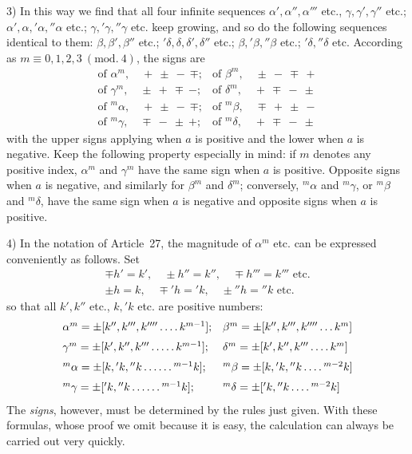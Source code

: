 3) In this way we find that all four infinite sequences $\alpha',\alpha'',\alpha'''$ etc., $\gamma,\gamma',\gamma''$ etc.; $\alpha',\alpha,{}'\alpha,{}''\alpha$ etc.; $\gamma,{}'\gamma,{}''\gamma$ etc. keep growing, and so do the following sequences identical to them: $\beta,\beta',\beta''$ etc.; ${}'\delta,\delta,\delta',\delta''$ etc.; $\beta,{}'\beta,{}''\beta$ etc.; ${}'\delta,{}''\delta$ etc. According as $m\equiv0,1,2,3\ (\mathrm{mod.}\ 4)$, the signs are
\[
\begin{array}{ll}
\text{of }\alpha^m,\quad +\ \pm\ -\ \mp;&\text{of }\beta^m,\quad \pm\ -\ \mp\ +\\[6pt]
\text{of }\gamma^m,\quad \pm\ +\ \mp\ -;&\text{of }\delta^m,\quad +\ \mp\ -\ \pm\\[6pt]
\text{of }{}^m\alpha,\quad +\ \pm\ -\ \mp;&\text{of }{}^m\beta,\quad \mp\ +\ \pm\ -\\[6pt]
\text{of }{}^m\gamma,\quad \mp\ -\ \pm\ +;&\text{of }{}^m\delta,\quad +\ \mp\ -\ \pm
\end{array}
\]
with the upper signs applying when $a$ is positive and the lower when $a$ is negative. Keep the following property especially in mind: if $m$ denotes any positive index, $\alpha^m$ and $\gamma^m$ have the same sign when $a$ is positive. Opposite signs when $a$ is negative, and similarly for $\beta^m$ and $\delta^m$; conversely, ${}^m\alpha$ and ${}^m\gamma$, or ${}^m\beta$ and ${}^m\delta$, have the same sign when $a$ is negative and opposite signs when $a$ is positive.

4) In the notation of Article~27, the magnitude of $\alpha^m$ etc. can be expressed conveniently as follows. Set
\[
\begin{gathered}
\mp h'=k',\quad \pm h''=k'',\quad \mp h'''=k'''\text{ etc.}\\
\pm h=k,\quad \mp{}'h={}'k,\quad \pm{}''h={}''k\text{ etc.}
\end{gathered}
\]
so that all $k',k''$ etc., $k,{}'k$ etc. are positive numbers:
{\small
\setlength{\arraycolsep}{3pt}
\[
\begin{array}{ll}
\alpha^m=\pm[k'',k''',k''''\mathinner{\ldotp\ldotp\ldotp\ldotp} k^{m-1}];&\beta^m=\pm[k'',k''',k''''\mathinner{\ldotp\ldotp\ldotp} {k^m]}\\[6pt]
\gamma^m=\pm[k',k'',k'''\mathinner{\ldotp\ldotp\ldotp\ldotp\ldotp} k^{m-1}];&\delta^m=\pm[k',k'',k'''\mathinner{\ldotp\ldotp\ldotp\ldotp} k^m]\\[6pt]
{}^m\alpha=\pm[k,{}'k,{}''k\mathinner{\ldotp\ldotp\ldotp\ldotp\ldotp\ldotp}{}^{m-1}k];&{}^m\beta=\pm[k,{}'k,{}''k\mathinner{\ldotp\ldotp\ldotp\ldotp}{}^{m-2}k]\\[6pt]
{}^m\gamma=\pm[{}'k,{}''k\mathinner{\ldotp\ldotp\ldotp\ldotp\ldotp\ldotp}{}^{m-1}k];&{}^m\delta=\pm[{}'k,{}''k\mathinner{\ldotp\ldotp\ldotp\ldotp}{}^{m-2}k]
\end{array}
\]
}
The \textit{signs}, however, must be determined by the rules just given. With these formulas, whose proof we omit because it is easy, the calculation can always be carried out very quickly.

